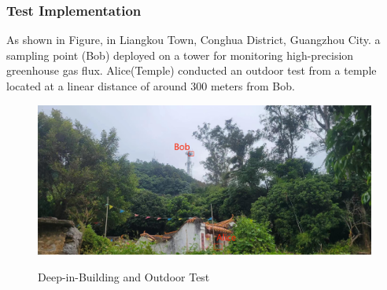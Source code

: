 \documentclass{beamer}
\begin{document}
\begin{frame}
  \frametitle{Test Implementation}
  As shown in Figure, in Liangkou Town, Conghua District, Guangzhou City. a sampling point (Bob) deployed on a tower for monitoring high-precision greenhouse gas flux. Alice(Temple) conducted an outdoor test from a temple located at a linear distance of around 300 meters from Bob.
  \begin{figure}
    {\includegraphics[width=0.72\linewidth]{../figures/conghua.jpg}}
    
    \caption{Deep-in-Building and Outdoor Test}\label{Test1}
  \end{figure}
\end{frame}
\end{document}
